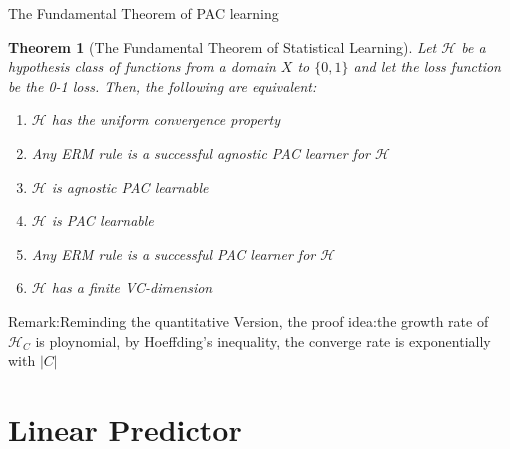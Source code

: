 \documentclass{beamer}
\newtheorem{thm}{Theorem}[subsection]
\begin{document}
\begin{frame}{The Fundamental Theorem of PAC learning}
	\begin{thm}[The Fundamental Theorem of Statistical Learning]
		Let $\mathcal{H}$ be a hypothesis class of functions from a domain $X$ to $\{0,1\}$ and let the loss function be the 0-1 loss. Then, the following are equivalent:
		\begin{enumerate}
			\item $\mathcal{H}$ has the uniform convergence property
			\item Any ERM rule is a successful agnostic PAC learner for $\mathcal{H}$
			\item $\mathcal{H}$ is agnostic PAC learnable
			\item $\mathcal{H}$ is PAC learnable
			\item Any ERM rule is a successful PAC learner for $\mathcal{H}$
			\item $\mathcal{H}$ has a finite VC-dimension
		\end{enumerate}
	\end{thm}
Remark:Reminding the quantitative Version, the proof idea:the growth rate of $\mathcal{H}_C$ is ploynomial, by Hoeffding's inequality, the converge rate is exponentially with $|C|$
\end{frame}
\section{Linear Predictor}
\end{document}
